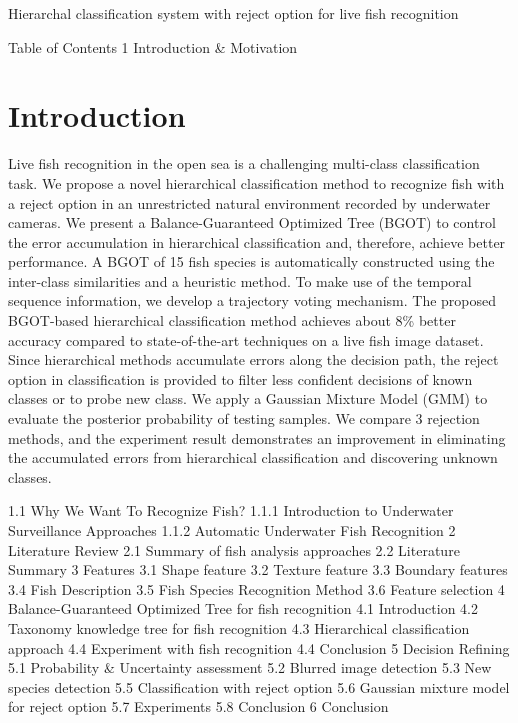 Hierarchal classification system with reject option for live fish recognition


Table of Contents
1 Introduction & Motivation
\section{Introduction}
\label{sec:introduction}
Live fish recognition in the open sea is a challenging multi-class classification task. We propose a novel hierarchical classification method to recognize fish with a reject option in an unrestricted natural environment recorded by underwater cameras. We present a Balance-Guaranteed Optimized Tree (BGOT) to control the error accumulation in hierarchical classification and, therefore, achieve better performance. A BGOT of 15 fish species is automatically constructed using the inter-class similarities and a heuristic method. To make use of the temporal sequence information, we develop a trajectory voting mechanism. The proposed BGOT-based hierarchical classification method achieves about 8\% better accuracy compared to state-of-the-art techniques on a live fish image dataset. Since hierarchical methods accumulate errors along the decision path, the reject option in classification is provided to filter less confident decisions of known classes or to probe new class. We apply a Gaussian Mixture Model (GMM) to
evaluate the posterior probability of testing samples. We compare 3 rejection methods, and the experiment result demonstrates an improvement in eliminating the accumulated errors from hierarchical classification and discovering unknown classes.

1.1 Why We Want To Recognize Fish?
1.1.1 Introduction to Underwater Surveillance Approaches
1.1.2 Automatic Underwater Fish Recognition
2 Literature Review
2.1 Summary of fish analysis approaches
2.2 Literature Summary
3 Features
3.1 Shape feature
3.2 Texture feature
3.3 Boundary features
3.4 Fish Description
3.5 Fish Species Recognition Method
3.6 Feature selection
4 Balance-Guaranteed Optimized Tree for fish recognition
4.1 Introduction
4.2 Taxonomy knowledge tree for fish recognition
4.3 Hierarchical classification approach
4.4 Experiment with fish recognition
4.4 Conclusion
5 Decision Refining
5.1 Probability & Uncertainty assessment
5.2 Blurred image detection
5.3 New species detection
5.5 Classification with reject option
5.6 Gaussian mixture model for reject option
5.7 Experiments
5.8 Conclusion
6 Conclusion
